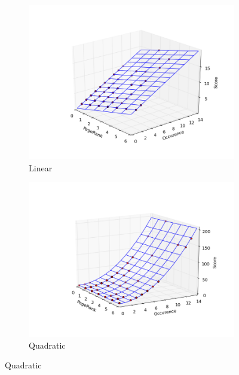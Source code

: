 \documentclass[12pt,notitlepage,twoside]{scrreprt}
\begin{document}
\begin{figure}[h!]
\centering
\begin{subfigure}[b]{.49\textwidth}
  \centering
  \includegraphics[width=\linewidth]{figs/lin.png}
  \caption{Linear}
  \label{lin}
\end{subfigure}
\begin{subfigure}[b]{.49\textwidth}
  \centering
  \includegraphics[width=\linewidth]{figs/quad.png}
  \caption{Quadratic}
  \label{quad}
\end{subfigure}


\end{figure}
\end{document}
